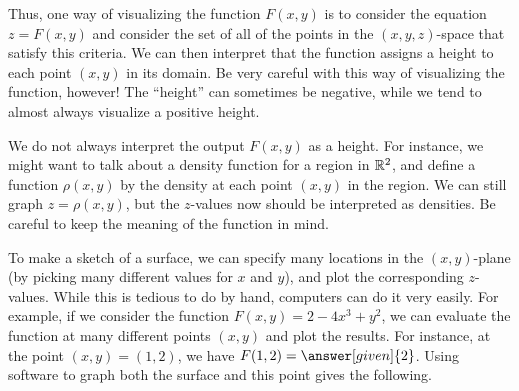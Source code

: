 \documentclass{ximera}
\begin{document}
Thus, one way of visualizing the function $F(x,y)$ is to consider the
equation $z=F(x,y)$ and consider the set of all of the points in the $(x,y,z)$-space
that satisfy this criteria.  We can then interpret that the function assigns a
height to each point $(x,y)$ in its domain.  Be very careful with this way 
of visualizing the function, however!  The ``height'' can sometimes be 
negative, while we tend to almost always visualize a positive height.  

\begin{remark}
We do not always interpret the output $F(x,y)$ as a height.  For instance, we might 
want to talk about a density function for a region in $\mathbb R^2$, and define a function $\rho(x,y)$
by the density at each point $(x,y)$ in the region.  We can still graph $z=\rho(x,y)$, but the 
$z$-values now should be interpreted as densities. Be careful to keep the meaning of the 
function in mind.
\end{remark}

To make a sketch of a surface, we can specify many locations in the
$(x,y)$-plane (by picking many different values for $x$ and $y$), and
plot the corresponding $z$-values.  While this is tedious to do by hand,
computers can do it very easily.  For example, if we consider the
function $F(x,y) = 2-4x^3+y^2$, we can evaluate the function at many
different points $(x,y)$ and plot the results.  For instance, at the point
$(x,y)=(1,2)$, we have $F(1,2) = \answer[given]{2}$.  Using software
to graph both the surface and this point gives the following.
\end{document}
